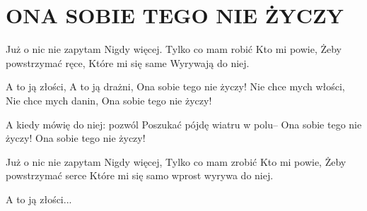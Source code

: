\documentclass[../../../songbook.tex]{subfiles}
\begin{document}
\TabPositions{8cm} %
\section*{ONA SOBIE TEGO NIE ŻYCZY}
{}
\vspace{0.5cm}
Już o nic nie zapytam		 \newline	
Nigdy więcej.			 \newline	
Tylko co mam robić		 \newline	
Kto mi powie,			  \newline	
Żeby powstrzymać ręce,		  \newline	
Które mi się same			 \newline	
Wyrywają do niej.			 \newline	

\-\hspace{1cm} A to ją złości,			 \newline	
\-\hspace{1cm} A to ją drażni,			 \newline	
\-\hspace{1cm} Ona sobie tego nie życzy!	 \newline	
\-\hspace{1cm} Nie chce mych włości,		 \newline	
\-\hspace{1cm} Nie chce mych danin,		 \newline	
\-\hspace{1cm} Ona sobie tego nie życzy!	 \newline	

\-\hspace{1cm} A kiedy mówię do niej: pozwól		 \newline	
\-\hspace{1cm} Poszukać pójdę wiatru w polu–		 \newline	
\-\hspace{1cm} Ona sobie tego nie życzy!		 \newline	
\-\hspace{1cm} Ona sobie tego nie życzy!		 \newline	

Już o nic nie zapytam				 \newline	
Nigdy więcej,				 \newline	
Tylko co mam zrobić				 \newline	
Kto mi powie,				 \newline	
Żeby powstrzymać serce				 \newline	
Które mi się samo  wprost wyrywa do niej.				 \newline	

\-\hspace{1cm} A to ją złości... 				 \newline	
\end{document}
